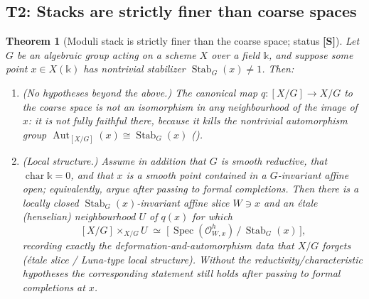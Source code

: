 \documentclass[12pt]{article}
\newtheorem{theorem}{Theorem}[section]
\theoremstyle{definition}
\theoremstyle{remark}
\newcommand{\Spec}{\operatorname{Spec}}
\newcommand{\Stab}{\operatorname{Stab}}
\newcommand{\Aut}{\operatorname{Aut}}
\newcommand{\Ohm}{\mathcal{O}}
\newcommand{\coeff}{\mathbb{k}}
\newcommand{\status}[1]{\textnormal{\textsf{\textbf{[#1]}}}}
\begin{document}
\subsection{T2: Stacks are strictly finer than coarse spaces}

\begin{theorem}[Moduli stack is strictly finer than the coarse space; status \status{S}]
\label{thm:stack}
Let $G$ be an algebraic group acting on a scheme $X$ over a field $\coeff$, and suppose some point
$x\in X(\coeff)$ has nontrivial stabilizer $\Stab_G(x)\neq 1$. Then:
\begin{enumerate}
  \item \textup{(No hypotheses beyond the above.)} The canonical map $q\colon [X/G]\to X/G$ to the
  coarse space is not an isomorphism in any neighbourhood of the image of $x$: it is not fully faithful
  there, because it kills the nontrivial automorphism group $\Aut_{[X/G]}(x)\cong\Stab_G(x)$
  ().
  \item \textup{(Local structure.)} Assume in addition that $G$ is \emph{smooth reductive}, that
  $\operatorname{char}\coeff=0$, and that $x$ is a smooth point contained in a $G$-invariant affine open;
  equivalently, argue after passing to formal completions. Then there is a locally closed
  $\Stab_G(x)$-invariant affine slice $W\ni x$ and an \'etale (henselian) neighbourhood $U$ of $q(x)$ for
  which
  \[
    [X/G] \times_{X/G} U \;\simeq\; \bigl[\, \Spec(\Ohm^{h}_{W,x}) \,/\, \Stab_G(x)\,\bigr],
  \]
  recording exactly the deformation-and-automorphism data that $X/G$ forgets (\'etale slice / Luna-type
  local structure). Without the reductivity/characteristic hypotheses the corresponding statement still
  holds after passing to formal completions at $x$.
\end{enumerate}
\end{theorem}
\end{document}
